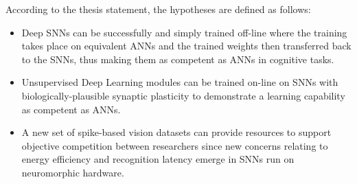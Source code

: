 According to the thesis statement, the hypotheses are defined as follows: 
\begin{itemize}
%

	\item 
	Deep SNNs can be successfully and simply trained off-line where the training takes place on equivalent ANNs and the trained weights then transferred back to the SNNs, thus making them as competent as ANNs in cognitive tasks. 
	

	\item 
	Unsupervised Deep Learning modules can be trained on-line on SNNs with biologically-plausible synaptic plasticity to demonstrate a learning capability as competent as ANNs.


	\item 
	A new set of spike-based vision datasets can provide resources to support objective competition between researchers since new concerns relating to energy efficiency and recognition latency emerge in SNNs run on neuromorphic hardware.

\end{itemize}


